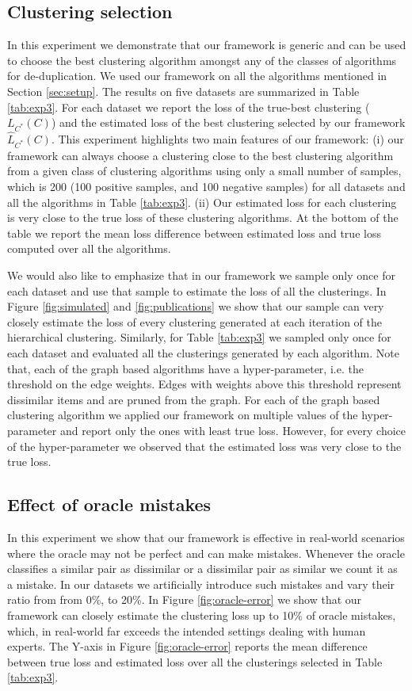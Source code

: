 \documentclass[12pt]{article}
\begin{document}
\subsection{Clustering selection}
\label{sec:exp1}
In this experiment we demonstrate that our framework is generic and can be used to choose the best clustering algorithm amongst any of the classes of algorithms for de-duplication.
We used our framework on all the algorithms mentioned in Section \ref{sec:setup}. The results on five datasets are summarized in Table \ref{tab:exp3}. For each dataset we report the loss of the true-best clustering ($L_{C^*}(C)$) and the estimated loss of the best clustering selected by our framework $\hat L_{C^*}(C)$.
This experiment highlights two main features of our framework: (i) our framework can always choose a clustering close to the best clustering  algorithm from a given class of clustering algorithms using only a small number of samples, which is 200 (100 positive samples, and 100 negative samples) for all datasets and all the algorithms in Table \ref{tab:exp3}. (ii) Our estimated loss for each clustering is very close to the true loss of these clustering algorithms. At the bottom of the table we report the mean loss difference between estimated loss and true loss computed over all the algorithms. 

We would also like to emphasize that in our framework we sample only once for each dataset and use that  sample to estimate the loss of all the clusterings. In Figure \ref{fig:simulated} and \ref{fig:publications} we show that our sample can very closely estimate the loss of every clustering generated at each iteration of the hierarchical clustering. Similarly, for Table \ref{tab:exp3} we sampled only once for each dataset and evaluated all the clusterings generated by each algorithm.
Note that, each of the graph based algorithms have a hyper-parameter, i.e. the threshold on the edge weights. Edges with weights above this threshold represent dissimilar items and are pruned from the graph. For each of the graph based clustering algorithm we applied our framework on multiple values of the hyper-parameter and report only the ones with least true loss. However, for every choice of the hyper-parameter we observed that the estimated loss was very close to the true loss.

\subsection{Effect of oracle mistakes}
\label{sec:exp2}
In this experiment we show that our framework is effective in real-world scenarios where the oracle may not be perfect and can make mistakes. Whenever the oracle classifies a similar pair as dissimilar or a dissimilar pair as similar we count it as a mistake. In our datasets we artificially introduce such mistakes and vary their ratio from from 0\%, to 20\%. In Figure \ref{fig:oracle-error} we show that our framework can closely estimate the clustering loss up to 10\% of oracle mistakes, which, in real-world far exceeds the intended settings dealing with human experts. The Y-axis in Figure \ref{fig:oracle-error} reports the mean difference between true loss and estimated loss over all the clusterings selected in Table \ref{tab:exp3}.
\end{document}
